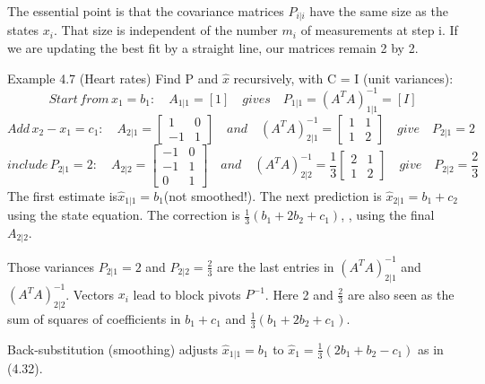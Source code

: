 	The essential point is that the covariance matrices $P_{i|i}$ have the same size as the
	states $x_i$. That size is independent of the number $m_i$ of measurements at step i. If we are
	updating the best fit by a straight line, our matrices remain 2 by 2.
	
	Example 4.7\; (Heart rates) Find P and $\hat{x}$ recursively, with C = I (unit variances):
	\begin{equation*}
	Start\, from\, x_1=b_1: \quad
	A_{1|1}=[1] \quad
	gives \quad
	P_{1|1}=(A^TA)^{-1}_{1|1}=[I]
	\end{equation*}
    \begin{equation*}
    Add\,x_2-x_1=c_1: \quad
    A_{2|1}=\begin{bmatrix} 1 & 0 \\ -1 & 1 \end{bmatrix}
    \quad and \quad
    (A^TA)^{-1}_{2|1}=\begin{bmatrix} 1 & 1 \\ 1 & 2 \end{bmatrix}
    \quad give \quad 
    P_{2|1}=2
    \end{equation*}
    \begin{equation*}
    include \,P_{2|1}=2: \quad
    A_{2|2}=\begin{bmatrix} -1 & 0 \\ -1 & 1 \\ 0 & 1 \end{bmatrix}
    \quad and \quad
    (A^TA)^{-1}_{2|2}=\frac{1}{3}\begin{bmatrix} 2 & 1 \\ 1 & 2 \end{bmatrix}
    \quad give \quad 
    P_{2|2}=\frac{2}{3}
    \end{equation*}	
	The first estimate is$\hat{x}_{1|1}=b_1$(not smoothed!). The next prediction is $\hat{x}_{2|1}=b_1+c_2$ using the state equation. The correction is $\frac{1}{3}(b_1+2b_2+c_1)$, , using the final $A_{2|2}$.
	
	Those variances $P_{2|1}=2$ and $P_{2|2}=\frac{2}{3}$ are the last entries in $(A^TA)^{-1}_{2|1}$ and $(A^TA)^{-1}_{2|2}$. Vectors $x_i$ lead to block pivots $P^{-1}$.
	Here 2 and $\frac{2}{3}$ are also seen as the sum of squares of	coefficients in $b_1+c_1$ and $\frac{1}{3}(b_1+2b_2+c_1)$.
	
	Back-substitution (smoothing) adjusts $\hat{x}_{1|1}=b_1$ to $\hat{x}_1=\frac{1}{3}(2b_1+b_2-c_1)$ as in (4.32).
	 
	
	
	
	
	
